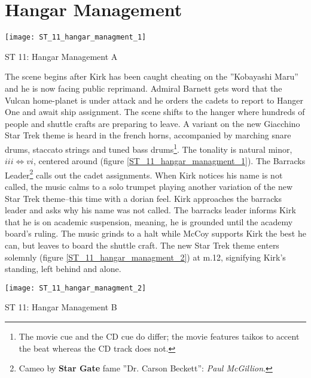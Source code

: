 \section{Hangar Management}
\begin{marginfigure}
\center
\texttt{[image: ST\_11\_hangar\_managment\_1]}
	\caption{ST 11: Hangar Management A}
	\label{ST_11_hangar_managment_1}
\end{marginfigure}
The scene begins after Kirk has been caught cheating on the ''Kobayashi Maru'' and he is now facing public reprimand. Admiral Barnett gets word that the Vulcan home-planet is under attack and he orders the cadets to report to Hanger One and await ship assignment. The scene shifts to the hanger where hundreds of people and shuttle crafts are preparing to leave. A variant on the new Giacchino Star Trek theme is heard in the french horns, accompanied by marching snare drums, staccato strings and tuned bass drums\footnote{The movie cue and the CD cue do differ; the movie features taikos to accent the beat whereas the CD track does not.}. The tonality is natural minor, \({iii}{\Leftrightarrow}{vi}\), centered around \aflat (figure \ref{ST_11_hangar_managment_1}). The Barracks Leader\footnote{Cameo by \textbf{Star Gate} fame ''Dr. Carson Beckett'': \textit{Paul McGillion}.} calls out the cadet assignments. When Kirk notices his name is not called, the music calms to a solo trumpet playing another variation of the new Star Trek theme--this time with a dorian feel. Kirk approaches the barracks leader and asks why his name was not called. The barracks leader informs Kirk that he is on academic suspension, meaning, he is grounded until the academy board's ruling. The music grinds to a halt while McCoy supports Kirk the best he can, but leaves to board the shuttle craft. The new Star Trek theme enters solemnly (figure \ref{ST_11_hangar_managment_2}) at m.12, signifying Kirk's standing, left behind and alone.

\begin{marginfigure}
\center
\texttt{[image: ST\_11\_hangar\_managment\_2]}
	\caption{ST 11: Hangar Management B}
	\label{ST_11_hangar_managment_2}
\end{marginfigure}
 
